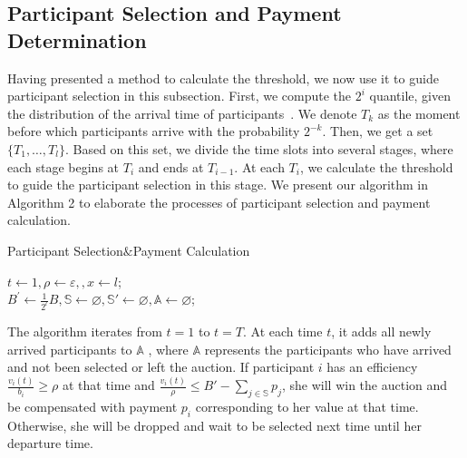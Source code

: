 \documentclass[conference,compsocconf,letterpaper,10pt]{IEEEtran}
\begin{document}
\subsection{Participant Selection and Payment Determination}
Having presented a method to calculate the threshold, we now use it to guide participant selection in this subsection. First, we compute the $2^i$ quantile, given the distribution of the arrival time of participants~\cite{singer2013pricing}. We denote $T_k$ as the moment before which participants arrive with the probability $2^{-k}$. Then, we get a set $\{T_1, \dots,T_l\}$.  Based on this set, we divide the time slots into several stages, where each stage begins at $T_i$ and ends at $T_{i-1}$. At each $T_i$, we calculate the threshold to guide the participant selection in this stage. We present our algorithm in Algorithm 2 to elaborate the processes of participant selection and payment calculation.

\begin{algorithm}
\BlankLine
{}
\caption{Participant Selection$\&$Payment Calculation}
\label{alg:participant selection}
\begin{small}
$t\leftarrow1, \rho\leftarrow\varepsilon, , x\leftarrow l$;\\
$B^{'} \gets \frac{1}{2^{l}}B, \mathbb{S}\leftarrow\varnothing, \mathbb{S}'\leftarrow\varnothing, \mathbb{A}\leftarrow\varnothing$;\\
\end{small}
\end{algorithm}

The algorithm iterates from $t=1$ to $t=T$. At each time $t$, it adds all newly arrived participants to $\mathbb{A}$ , where $\mathbb{A}$ represents the participants who have arrived and not been selected or left the auction. If participant $i$ has an efficiency  $\frac{v_i(t)}{b_i} \ge \rho$ at that time and $\frac{v_i(t)}{\rho} \le B'-\sum_{j \in\mathbb{S}}p_j$, she will win the auction and be compensated with payment $p_i$ corresponding to her value at that time. Otherwise, she will be dropped and wait to be selected next time until her departure time.
\end{document}
